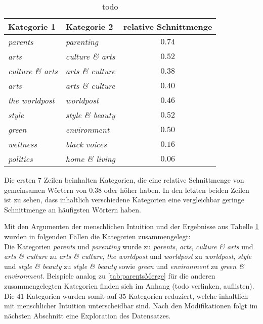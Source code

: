 \documentclass[a4paper,11pt]{article}
\begin{document}
\begin{table}[ht]
\begin{center}
\begin{tabular}{|l|l|c|}
  \hline
Kategorie 1 & Kategorie 2  & relative Schnittmenge \\ 
  \hline
\textit{parents} & \textit{parenting} & $0.74$ \\
\textit{arts} & \textit{culture \& arts} & $0.52$\\
\textit{culture \& arts} & \textit{arts \& culture} &  $0.38$\\
\textit{arts} & \textit{arts \& culture}  & $0.40$\\
\textit{the worldpost} & \textit{worldpost} & $0.46$ \\
\textit{style} & \textit{style \& beauty} & $0.52$ \\
\textit{green} & \textit{environment} & $0.50$ \\
\hline
\textit{wellness} & \textit{black voices} & $0.16$ \\
\textit{politics} & \textit{home \& living} & $0.06$ \\
   \hline
\end{tabular}
\label{tab:categoryMerge}
\caption{todo}
\end{center}
\end{table}

Die ersten $7$ Zeilen beinhalten Kategorien, die eine relative Schnittmenge von gemeinsamen Wörtern von $0.38$ oder höher haben. In den letzten beiden Zeilen ist zu sehen, dass inhaltlich verschiedene Kategorien eine vergleichbar geringe Schnittmenge an häufigsten Wörtern haben.

Mit den Argumenten der menschlichen Intuition und der Ergebnisse aus Tabelle \ref{tab:categoryMerge} wurden in folgenden Fällen die Kategorien zusammengelegt: \\
Die Kategorien \textit{parents} und \textit{parenting} wurde zu \textit{parents}, \textit{arts}, \textit{culture \& arts} und \textit{arts \& culture} zu \textit{arts \& culture}, \textit{the worldpost} und \textit{worldpost} zu \textit{worldpost}, \textit{style} und \textit{style \& beauty} zu \textit{style \& beauty} sowie \textit{green} und \textit{environment} zu \textit{green \& environment}. Beispiele analog zu \ref{tab:parentsMerge} für die anderen zusammengelegten Kategorien finden sich im Anhang (todo verlinken, auflisten). Die $41$ Kategorien wurden somit auf $35$ Kategorien reduziert, welche inhaltlich mit menschlicher Intuition unterscheidbar sind. Nach den Modifikationen folgt im nächsten Abschnitt eine Exploration des Datensatzes.
\end{document}
